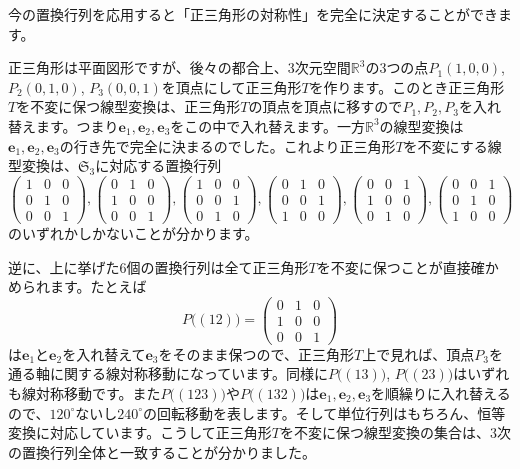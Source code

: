 今の置換行列を応用すると「正三角形の対称性」を完全に決定することができます。

正三角形は平面図形ですが、後々の都合上、$3$次元空間$\mathbb{R}^3$の$3$つの点$P_1(1, 0, 0)$, $P_2(0 ,1, 0)$, $P_3(0, 0, 1)$を頂点にして正三角形$T$を作ります。このとき正三角形$T$を不変に保つ線型変換は、正三角形$T$の頂点を頂点に移すので$P_1, P_2, P_3$を入れ替えます。つまり$\bm{e}_1, \bm{e}_2, \bm{e}_3$をこの中で入れ替えます。一方$\mathbb{R}^3$の線型変換は$\bm{e}_1, \bm{e}_2, \bm{e}_3$の行き先で完全に決まるのでした。これより正三角形$T$を不変にする線型変換は、$\mathfrak{S}_3$に対応する置換行列
\[
\begin{pmatrix}
1 & 0 & 0 \\
0 & 1 & 0 \\
0 & 0 & 1
\end{pmatrix}, 
\begin{pmatrix}
0 & 1 & 0 \\
1 & 0 & 0 \\
0 & 0 & 1
\end{pmatrix}, 
\begin{pmatrix}
1 & 0 & 0 \\
0 & 0 & 1 \\
0 & 1 & 0
\end{pmatrix}, 
\begin{pmatrix}
0 & 1 & 0 \\
0 & 0 & 1 \\
1 & 0 & 0
\end{pmatrix}, 
\begin{pmatrix}
0 & 0 & 1 \\
1 & 0 & 0 \\
0 & 1 & 0
\end{pmatrix}, 
\begin{pmatrix}
0 & 0 & 1 \\
0 & 1 & 0 \\
1 & 0 & 0
\end{pmatrix}
\]
のいずれかしかないことが分かります。

逆に、上に挙げた$6$個の置換行列は全て正三角形$T$を不変に保つことが直接確かめられます。たとえば
\[
P\bigl((12)\bigr) = 
\begin{pmatrix}
0 & 1 & 0 \\
1 & 0 & 0 \\
0 & 0 & 1
\end{pmatrix}
\]
は$\bm{e}_1$と$\bm{e}_2$を入れ替えて$\bm{e}_3$をそのまま保つので、正三角形$T$上で見れば、頂点$P_3$を通る軸に関する線対称移動になっています。同様に$P\bigl((13)\bigr)$, $P\bigl((23)\bigr)$はいずれも線対称移動です。また$P\bigl((123)\bigr)$や$P\bigl((132)\bigr)$は$\bm{e}_1, \bm{e}_2, \bm{e}_3$を順繰りに入れ替えるので、$120^{\circ}$ないし$240^{\circ}$の回転移動を表します。そして単位行列はもちろん、恒等変換に対応しています。こうして正三角形$T$を不変に保つ線型変換の集合は、$3$次の置換行列全体と一致することが分かりました。

